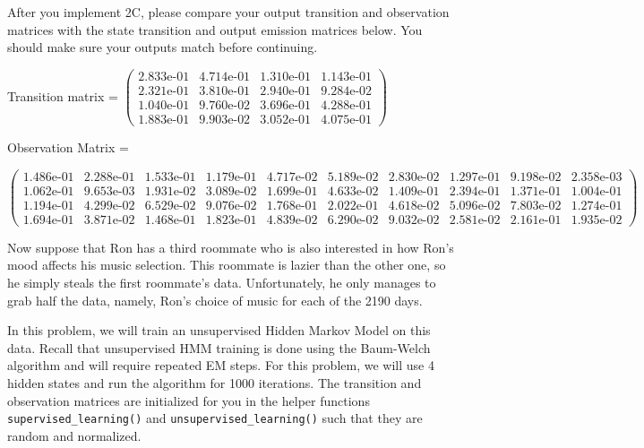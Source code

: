 After you implement 2C, please compare your output transition and observation matrices with the state transition and output emission matrices below. You should make sure your outputs match before continuing.

Transition matrix = \small $\begin{pmatrix}
    2.833\text{e-}01 & 4.714\text{e-}01 & 1.310\text{e-}01 & 1.143\text{e-}01 \\
    2.321\text{e-}01 & 3.810\text{e-}01 & 2.940\text{e-}01 & 9.284\text{e-}02 \\
    1.040\text{e-}01 & 9.760\text{e-}02 & 3.696\text{e-}01 & 4.288\text{e-}01 \\
    1.883\text{e-}01 & 9.903\text{e-}02 & 3.052\text{e-}01 & 4.075\text{e-}01 
\end{pmatrix}$
\normalsize

Observation Matrix =

\small
$\begin{pmatrix}
1.486\text{e-}01 & 2.288\text{e-}01 & 1.533\text{e-}01 & 1.179\text{e-}01 & 4.717\text{e-}02 & 5.189\text{e-}02 & 2.830\text{e-}02 & 1.297\text{e-}01 & 9.198\text{e-}02 & 2.358\text{e-}03 \\
1.062\text{e-}01 & 9.653\text{e-}03 & 1.931\text{e-}02 & 3.089\text{e-}02 & 1.699\text{e-}01 & 4.633\text{e-}02 & 1.409\text{e-}01 & 2.394\text{e-}01 & 1.371\text{e-}01 & 1.004\text{e-}01 \\
1.194\text{e-}01 & 4.299\text{e-}02 & 6.529\text{e-}02 & 9.076\text{e-}02 & 1.768\text{e-}01 & 2.022\text{e-}01 & 4.618\text{e-}02 & 5.096\text{e-}02 & 7.803\text{e-}02 & 1.274\text{e-}01 \\
1.694\text{e-}01 & 3.871\text{e-}02 & 1.468\text{e-}01 & 1.823\text{e-}01 & 4.839\text{e-}02 & 6.290\text{e-}02 & 9.032\text{e-}02 & 2.581\text{e-}02 & 2.161\text{e-}01 & 1.935\text{e-}02 
\end{pmatrix}$
\normalsize
\medskip

\begin{solution}
\end{solution}
\indent\problem[15] %
Now suppose that Ron has a third roommate who is also interested in how Ron's mood affects his music selection. This roommate is lazier than the other one, so he simply steals the first roommate's data. Unfortunately, he only manages to grab half the data, namely, Ron's choice of music for each of the 2190 days.

In this problem, we will train an unsupervised Hidden Markov Model on this data. Recall that unsupervised HMM training is done using the Baum-Welch algorithm and will require repeated EM steps. For this problem, we will use 4 hidden states and run the algorithm for 1000 iterations. The transition and observation matrices are initialized for you in the helper functions \texttt{supervised\_learning()} and \texttt{unsupervised\_learning()} such that they are random and normalized.

